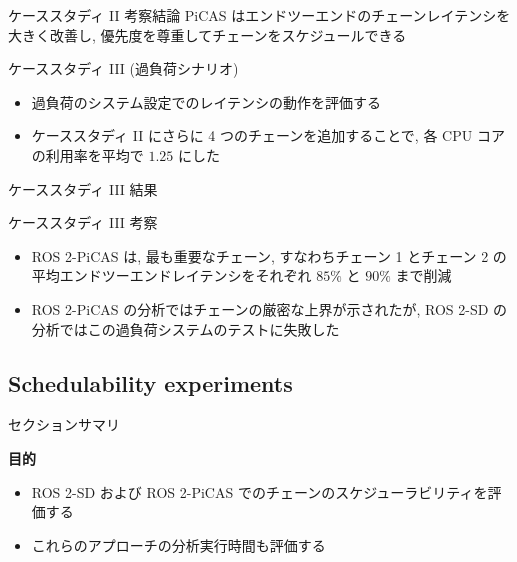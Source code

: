 \begin{frame}{ケーススタディ II 考察結論}
    PiCAS はエンドツーエンドのチェーンレイテンシを大きく改善し, 優先度を尊重してチェーンをスケジュールできる
\end{frame}


\begin{frame}{ケーススタディ III (過負荷シナリオ)}
    \begin{itemize}
        \item 過負荷のシステム設定でのレイテンシの動作を評価する
        \item ケーススタディ II にさらに 4 つのチェーンを追加することで, 各 CPU コアの利用率を平均で $1.25$ にした
    \end{itemize}
\end{frame}

\begin{frame}{ケーススタディ III 結果}
\end{frame}

\begin{frame}{ケーススタディ III 考察}
    \begin{itemize}
        \item ROS 2-PiCAS は, 最も重要なチェーン, すなわちチェーン 1 とチェーン 2 の平均エンドツーエンドレイテンシをそれぞれ $85 \%$ と $90 \%$ まで削減
        \item ROS 2-PiCAS の分析ではチェーンの厳密な上界が示されたが, ROS 2-SD の分析ではこの過負荷システムのテストに失敗した
    \end{itemize}
\end{frame}


\subsection{Schedulability experiments}
\label{ssec: schedulability experiments}

\begin{frame}{セクションサマリ}
    \begin{itembox}[l]{\textbf{目的}}
        \begin{itemize}
            \item ROS 2-SD および ROS 2-PiCAS でのチェーンのスケジューラビリティを評価する
            \item これらのアプローチの分析実行時間も評価する
        \end{itemize}
    \end{itembox}
\end{frame}

